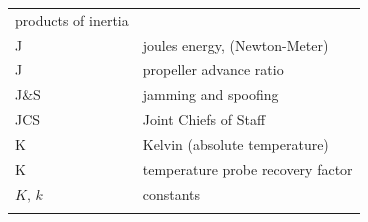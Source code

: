 \documentclass[
]{book}
\begin{document}
\begin{longtable}[]{@{}ll@{}}
\begin{minipage}[t]{0.47\columnwidth}
products of inertia\strut
\end{minipage}\tabularnewline
\begin{minipage}[t]{0.47\columnwidth}\raggedright
J\strut
\end{minipage} & \begin{minipage}[t]{0.47\columnwidth}\raggedright
joules energy, (Newton-Meter)\strut
\end{minipage}\tabularnewline
\begin{minipage}[t]{0.47\columnwidth}\raggedright
J\strut
\end{minipage} & \begin{minipage}[t]{0.47\columnwidth}\raggedright
propeller advance ratio\strut
\end{minipage}\tabularnewline
\begin{minipage}[t]{0.47\columnwidth}\raggedright
J\&S\strut
\end{minipage} & \begin{minipage}[t]{0.47\columnwidth}\raggedright
jamming and spoofing\strut
\end{minipage}\tabularnewline
\begin{minipage}[t]{0.47\columnwidth}\raggedright
JCS\strut
\end{minipage} & \begin{minipage}[t]{0.47\columnwidth}\raggedright
Joint Chiefs of Staff\strut
\end{minipage}\tabularnewline
\begin{minipage}[t]{0.47\columnwidth}\raggedright
K\strut
\end{minipage} & \begin{minipage}[t]{0.47\columnwidth}\raggedright
Kelvin (absolute temperature)\strut
\end{minipage}\tabularnewline
\begin{minipage}[t]{0.47\columnwidth}\raggedright
K\strut
\end{minipage} & \begin{minipage}[t]{0.47\columnwidth}\raggedright
temperature probe recovery factor\strut
\end{minipage}\tabularnewline
\begin{minipage}[t]{0.47\columnwidth}\raggedright
\(K\text{, }k\)\strut
\end{minipage} & \begin{minipage}[t]{0.47\columnwidth}\raggedright
constants\strut
\end{minipage}\tabularnewline
\begin{minipage}[t]{0.47\columnwidth}\raggedright

\end{minipage}
\end{longtable}
\end{document}
